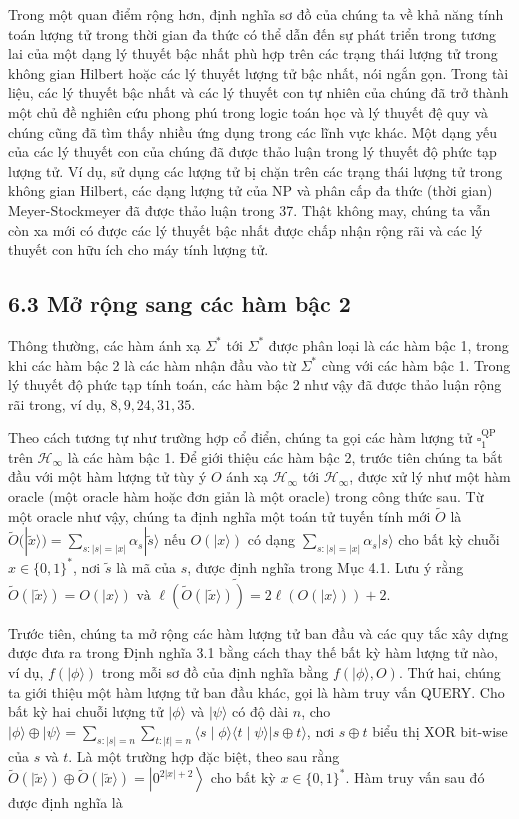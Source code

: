 \documentclass[10pt]{article}
\begin{document}
\begin{enumerate}
Trong một quan điểm rộng hơn, định nghĩa sơ đồ của chúng ta về khả năng tính toán lượng tử trong thời gian đa thức có thể dẫn đến sự phát triển trong tương lai của một dạng lý thuyết bậc nhất phù hợp trên các trạng thái lượng tử trong không gian Hilbert hoặc các lý thuyết lượng tử bậc nhất, nói ngắn gọn. Trong tài liệu, các lý thuyết bậc nhất và các lý thuyết con tự nhiên của chúng đã trở thành một chủ đề nghiên cứu phong phú trong logic toán học và lý thuyết đệ quy và chúng cũng đã tìm thấy nhiều ứng dụng trong các lĩnh vực khác. Một dạng yếu của các lý thuyết con của chúng đã được thảo luận trong lý thuyết độ phức tạp lượng tử. Ví dụ, sử dụng các lượng tử bị chặn trên các trạng thái lượng tử trong không gian Hilbert, các dạng lượng tử của NP và phân cấp đa thức (thời gian) Meyer-Stockmeyer đã được thảo luận trong 37. Thật không may, chúng ta vẫn còn xa mới có được các lý thuyết bậc nhất được chấp nhận rộng rãi và các lý thuyết con hữu ích cho máy tính lượng tử.

\subsection*{6.3 Mở rộng sang các hàm bậc 2}
Thông thường, các hàm ánh xạ $\Sigma^{*}$ tới $\Sigma^{*}$ được phân loại là các hàm bậc 1, trong khi các hàm bậc 2 là các hàm nhận đầu vào từ $\Sigma^{*}$ cùng với các hàm bậc 1. Trong lý thuyết độ phức tạp tính toán, các hàm bậc 2 như vậy đã được thảo luận rộng rãi trong, ví dụ, $8,9,24,31,35$.

Theo cách tương tự như trường hợp cổ điển, chúng ta gọi các hàm lượng tử $\square_{1}^{\mathrm{QP}}$ trên $\mathcal{H}_{\infty}$ là các hàm bậc 1. Để giới thiệu các hàm bậc 2, trước tiên chúng ta bắt đầu với một hàm lượng tử tùy ý $O$ ánh xạ $\mathcal{H}_{\infty}$ tới $\mathcal{H}_{\infty}$, được xử lý như một hàm oracle (một oracle hàm hoặc đơn giản là một oracle) trong công thức sau. Từ một oracle như vậy, chúng ta định nghĩa một toán tử tuyến tính mới $\tilde{O}$ là $\tilde{O}(|\tilde{x}\rangle)=\sum_{s:|s|=|x|} \alpha_{s}|\tilde{s}\rangle$ nếu $O(|x\rangle)$ có dạng $\sum_{s:|s|=|x|} \alpha_{s}|s\rangle$ cho bất kỳ chuỗi $x \in\{0,1\}^{*}$, nơi $\tilde{s}$ là mã của $s$, được định nghĩa trong Mục 4.1. Lưu ý rằng $\tilde{O}(|\tilde{x}\rangle)= \widetilde{O(|x\rangle) \text { và } \ell(\tilde{O}(|\tilde{x}\rangle))=2 \ell(O(|x\rangle))+2 \text {. }}$

Trước tiên, chúng ta mở rộng các hàm lượng tử ban đầu và các quy tắc xây dựng được đưa ra trong Định nghĩa 3.1 bằng cách thay thế bất kỳ hàm lượng tử nào, ví dụ, $f(|\phi\rangle)$ trong mỗi sơ đồ của định nghĩa bằng $f(|\phi\rangle, O)$. Thứ hai, chúng ta giới thiệu một hàm lượng tử ban đầu khác, gọi là hàm truy vấn QUERY. Cho bất kỳ hai chuỗi lượng tử $|\phi\rangle$ và $|\psi\rangle$ có độ dài $n$, cho $|\phi\rangle \oplus|\psi\rangle=\sum_{s:|s|=n} \sum_{t:|t|=n}\langle s \mid \phi\rangle\langle t \mid \psi\rangle|s \oplus t\rangle$, nơi $s \oplus t$ biểu thị XOR bit-wise của $s$ và $t$. Là một trường hợp đặc biệt, theo sau rằng $\tilde{O}(|\tilde{x}\rangle) \oplus \tilde{O}(|\tilde{x}\rangle)=\left|0^{2|x|+2}\right\rangle$ cho bất kỳ $x \in\{0,1\}^{*}$. Hàm truy vấn sau đó được định nghĩa là


\end{enumerate}
\end{document}
